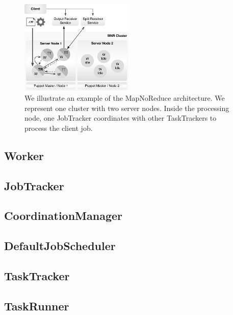 \documentclass[times, 10pt,twocolumn]{article}
\begin{document}
        \begin{figure}[!h]
            \begin{center}
                \includegraphics[width=0.48\textwidth]{pics/architecture.pdf}
                \caption{We illustrate an example of the MapNoReduce architecture. We represent one cluster with two server nodes. Inside the processing node, one JobTracker coordinates with other TaskTrackers to process the client job.  }
                \label{fig:basdatawarehouse}
            \end{center}
        \end{figure}
        
    	\subsection{Worker}
        
    
    	\subsection{JobTracker}
    	
    	\subsection{CoordinationManager}
    	
    	\subsection{DefaultJobScheduler}
    	
    	\subsection{TaskTracker}
    	
    	\subsection{TaskRunner}
    	
\end{document}
